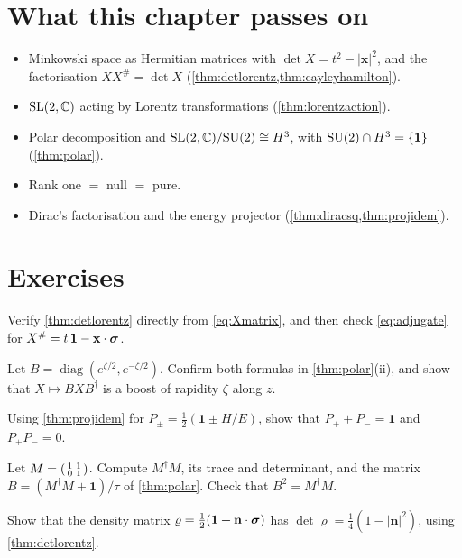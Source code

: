 \section*{What this chapter passes on}
\begin{itemize}[nosep]
\item Minkowski space as Hermitian matrices with $\det X=t^2-|\mathbf x|^2$, and the factorisation $XX^\#=\det X$ (\cref{thm:detlorentz,thm:cayleyhamilton}).
\item $\mathrm{SL}(2,\mathbb{C})$ acting by Lorentz transformations (\cref{thm:lorentzaction}).
\item Polar decomposition and $\mathrm{SL}(2,\mathbb{C})/\mathrm{SU}(2)\cong H^3$, with $\mathrm{SU}(2)\cap H^3=\{\mathbf 1\}$ (\cref{thm:polar}).
\item Rank one $=$ null $=$ pure.
\item Dirac's factorisation and the energy projector (\cref{thm:diracsq,thm:projidem}).
\end{itemize}

\section*{Exercises}
\begin{exercise}
Verify \cref{thm:detlorentz} directly from \eqref{eq:Xmatrix}, and then check \eqref{eq:adjugate} for $X^\#=t\,\mathbf 1-\mathbf x\cdot\boldsymbol{\sigma}$.
\end{exercise}
\begin{exercise}
Let $B=\operatorname{diag}(e^{\zeta/2},e^{-\zeta/2})$. Confirm both formulas in \cref{thm:polar}(ii), and show that $X\mapsto BXB^\dagger$ is a boost of rapidity $\zeta$ along $z$.
\end{exercise}
\begin{exercise}
Using \cref{thm:projidem} for $P_\pm=\tfrac12(\mathbf 1\pm H/E)$, show that $P_++P_-=\mathbf 1$ and $P_+P_-=0$.
\end{exercise}
\begin{exercise}
Let $M=\begin{psmallmatrix}1&1\\0&1\end{psmallmatrix}$. Compute $M^\dagger M$, its trace and determinant, and the matrix $B=(M^\dagger M+\mathbf 1)/\tau$ of \cref{thm:polar}. Check that $B^2=M^\dagger M$.
\end{exercise}
\begin{exercise}
Show that the density matrix $\varrho=\tfrac12(\mathbf 1+\mathbf n\cdot\boldsymbol{\sigma})$ has $\det\varrho=\tfrac14(1-|\mathbf n|^2)$, using \cref{thm:detlorentz}.
\end{exercise}

